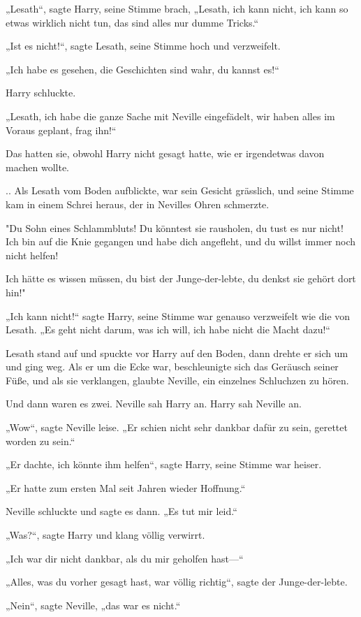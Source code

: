 {„Lesath“, sagte Harry, seine Stimme brach, „Lesath, ich kann nicht, ich kann so etwas wirklich nicht tun, das sind alles nur dumme Tricks.“

„Ist es nicht!“, sagte Lesath, seine Stimme hoch und verzweifelt.

„Ich habe es gesehen, die Geschichten sind wahr, du kannst es!“

Harry schluckte.

„Lesath, ich habe die ganze Sache mit Neville eingefädelt, wir haben alles im Voraus geplant, frag ihn!“

Das hatten sie, obwohl Harry nicht gesagt hatte, wie er irgendetwas davon machen wollte.

.. Als Lesath vom Boden aufblickte, war sein Gesicht grässlich, und seine Stimme kam in einem Schrei heraus, der in Nevilles Ohren schmerzte.

"Du Sohn eines Schlammbluts! Du könntest sie rausholen, du tust es nur nicht! Ich bin auf die Knie gegangen und habe dich angefleht, und du willst immer noch nicht helfen!

Ich hätte es wissen müssen, du bist der Junge-der-lebte, du denkst sie gehört dort hin!"

„Ich kann nicht!“ sagte Harry, seine Stimme war genauso verzweifelt wie die von Lesath. „Es geht nicht darum, was ich will, ich habe nicht die Macht dazu!“

Lesath stand auf und spuckte vor Harry auf den Boden, dann drehte er sich um und ging weg. Als er um die Ecke war, beschleunigte sich das Geräusch seiner Füße, und als sie verklangen, glaubte Neville, ein einzelnes Schluchzen zu hören.

Und dann waren es zwei. Neville sah Harry an. Harry sah Neville an.

„Wow“, sagte Neville leise. „Er schien nicht sehr dankbar dafür zu sein, gerettet worden zu sein.“

„Er dachte, ich könnte ihm helfen“, sagte Harry, seine Stimme war heiser.

„Er hatte zum ersten Mal seit Jahren wieder Hoffnung.“

Neville schluckte und sagte es dann. „Es tut mir leid.“

„Was?“, sagte Harry und klang völlig verwirrt.

„Ich war dir nicht dankbar, als du mir geholfen hast—“

„Alles, was du vorher gesagt hast, war völlig richtig“, sagte der Junge-der-lebte.

„Nein“, sagte Neville, „das war es nicht.“

}
